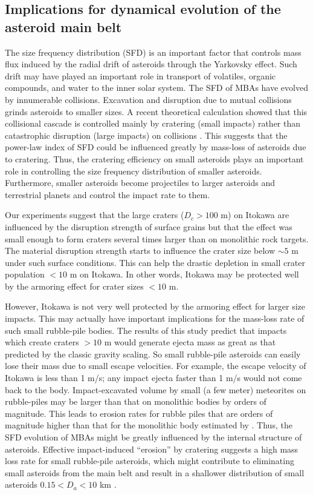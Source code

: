 \documentclass[3p,authoryear]{elsarticle}
\begin{document}
 \subsection{Implications for dynamical evolution of the asteroid main belt}
The size frequency distribution (SFD) is an important factor that controls mass flux induced by the radial drift of asteroids through the Yarkovsky effect. Such drift may have played an important role in transport of volatiles, organic compounds, and water to the inner solar system. The SFD of MBAs have evolved by innumerable collisions. Excavation and disruption due to mutual collisions grinds asteroids to smaller sizes. A recent theoretical calculation showed that this collisional cascade is controlled mainly by cratering (small impacts) rather than catastrophic disruption (large impacts) on collisions \citep{kobayashi2010}. This suggests that the power-law index of SFD could be influenced greatly by mass-loss of asteroids due to cratering. Thus, the cratering efficiency on small asteroids plays an important role in controlling the size frequency distribution of smaller asteroids. Furthermore, smaller asteroids become projectiles to larger asteroids and terrestrial planets and control the impact rate to them.

Our experiments suggest that the large craters ($D_c>100$ m) on Itokawa are influenced by the disruption strength of surface grains but that the effect was small enough to form craters several times larger than on monolithic rock targets. The material disruption strength starts to influence the crater size below $\sim 5$ m under such surface conditions. This can help the drastic depletion in small crater population $< 10$ m on Itokawa. In other words, Itokawa may be protected well by the armoring effect for crater sizes $<10$ m.

However, Itokawa is not very well protected by the armoring effect for larger size impacts.
This may actually have important implications for the mass-loss rate of such small rubble-pile bodies. The results of this study predict that impacts which create craters $>10$ m would generate ejecta mass as great as that predicted by the classic gravity scaling. So small rubble-pile asteroids can easily lose their mass due to small escape velocities. For example, the escape velocity of Itokawa is less than 1 m/s; any impact ejecta faster than 1 m/s would not come back to the body. Impact-excavated volume by small (a few meter) meteorites on rubble-piles may be larger than that on monolithic bodies by orders of magnitude. This leads to erosion rates for rubble piles that are orders of magnitude higher than that for the monolithic body estimated by \citet{kobayashi2010}. Thus, the SFD evolution of MBAs might be greatly influenced by the internal structure of asteroids. Effective impact-induced ``erosion'' by cratering suggests a high mass loss rate for small rubble-pile asteroids, which might contribute to eliminating small asteroids from the main belt and result in a shallower distribution of small asteroids $0.15 <D_a<10$ km \citep{yoshida2007, gladman2009}.
\end{document}
